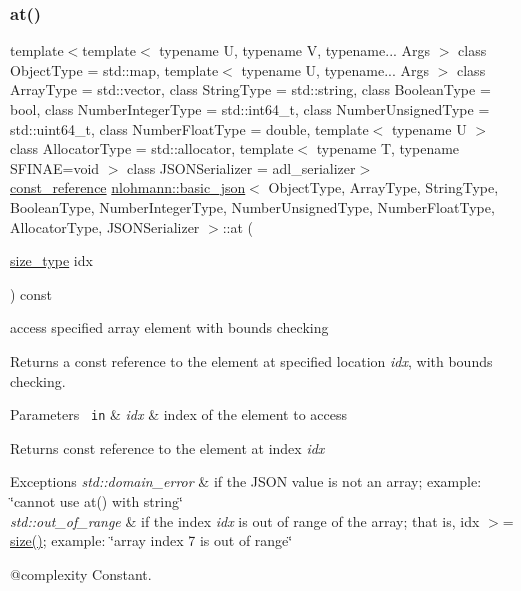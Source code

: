 \subsubsection{\texorpdfstring{at()}{at()}\hspace{0.1cm}{\footnotesize\ttfamily [2/6]}}
{\footnotesize\ttfamily template$<$template$<$ typename U, typename V, typename... Args $>$ class Object\+Type = std\+::map, template$<$ typename U, typename... Args $>$ class Array\+Type = std\+::vector, class String\+Type  = std\+::string, class Boolean\+Type  = bool, class Number\+Integer\+Type  = std\+::int64\+\_\+t, class Number\+Unsigned\+Type  = std\+::uint64\+\_\+t, class Number\+Float\+Type  = double, template$<$ typename U $>$ class Allocator\+Type = std\+::allocator, template$<$ typename T, typename S\+F\+I\+N\+A\+E=void $>$ class J\+S\+O\+N\+Serializer = adl\+\_\+serializer$>$ \\
\mbox{\hyperlink{classnlohmann_1_1basic__json_a4057c5425f4faacfe39a8046871786ca}{const\+\_\+reference}} \mbox{\hyperlink{classnlohmann_1_1basic__json}{nlohmann\+::basic\+\_\+json}}$<$ Object\+Type, Array\+Type, String\+Type, Boolean\+Type, Number\+Integer\+Type, Number\+Unsigned\+Type, Number\+Float\+Type, Allocator\+Type, J\+S\+O\+N\+Serializer $>$\+::at (\begin{DoxyParamCaption}\item[{\mbox{\hyperlink{classnlohmann_1_1basic__json_a39f2cd0b58106097e0e67bf185cc519b}{size\+\_\+type}}}]{idx }\end{DoxyParamCaption}) const\hspace{0.3cm}{\ttfamily [inline]}}



access specified array element with bounds checking 

Returns a const reference to the element at specified location {\itshape idx}, with bounds checking.


\begin{DoxyParams}[1]{Parameters}
\mbox{\texttt{ in}}  & {\em idx} & index of the element to access\\
\hline
\end{DoxyParams}
\begin{DoxyReturn}{Returns}
const reference to the element at index {\itshape idx} 
\end{DoxyReturn}

\begin{DoxyExceptions}{Exceptions}
{\em std\+::domain\+\_\+error} & if the J\+S\+ON value is not an array; example\+: {\ttfamily \char`\"{}cannot use at() with string\char`\"{}} \\
\hline
{\em std\+::out\+\_\+of\+\_\+range} & if the index {\itshape idx} is out of range of the array; that is, {\ttfamily idx $>$= \mbox{\hyperlink{classnlohmann_1_1basic__json_a25e27ad0c6d53c01871c5485e1f75b96}{size()}}}; example\+: {\ttfamily \char`\"{}array index 7 is out of range\char`\"{}}\\
\hline
\end{DoxyExceptions}
@complexity Constant.

